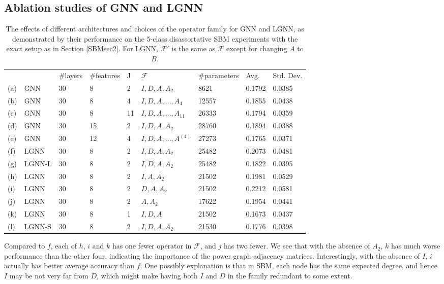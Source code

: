 \documentclass{article} \usepackage{iclr2019_conference,times}
\begin{document}
\subsection{Ablation studies of GNN and LGNN}
\label{ablations}
\begin{table}[h]


{\small 
\begin{tabular}{lllllllll}
 & & \#layers & \#features & J & $\mathcal{F}$ & \#parameters & Avg. & Std. Dev. \\
(a) & GNN & 30 & 8 & 2 & $I, D, A, A_2$ & 8621 & 0.1792 & 0.0385 \\
(b) & GNN & 30 & 8 & 4 & $I, D, A, ..., A_{4}$ & 12557 & 0.1855 & 0.0438 \\
(c) & GNN & 30 & 8 & 11 & $I, D, A, ..., A_{11}$ & 26333 & 0.1794 & 0.0359 \\
(d) & GNN & 30 & 15 & 2 & $I, D, A, A_{2}$ & 28760 & 0.1894 & 0.0388 \\
(e) & GNN & 30 & 12 & 4 & $I, D, A, ..., A^{(4)}$ & 27273 & 0.1765 & 0.0371 \\
(f) & LGNN & 30 & 8 & 2 & $I, D, A, A_{2}$ & 25482 & 0.2073 & 0.0481 \\
(g) & LGNN-L & 30 & 8 & 2 & $I, D, A, A_{2}$ & 25482 & 0.1822 & 0.0395 \\
(h) & LGNN & 30 & 8 & 2 & $I, A, A_{2}$ & 21502 & 0.1981 & 0.0529 \\
(i) & LGNN & 30 & 8 & 2 & $D, A, A_{2}$ & 21502 & 0.2212 & 0.0581 \\
(j) & LGNN & 30 & 8 & 2 & $A, A_{2}$ & 17622 & 0.1954 & 0.0441 \\
(k) & LGNN & 30 & 8 & 1 & $I, D, A$ & 21502 & 0.1673 & 0.0437 \\
(l) & LGNN-S & 30 & 8 & 2 & $I, D, A, A_{2}$ & 21530 & 0.1776 & 0.0398
\end{tabular}
  }
  \caption{\footnotesize{The effects of different architectures and choices of the operator family for GNN and LGNN, as demonstrated by their performance on the 5-class disassortative SBM experiments with the exact setup as in Section \ref{SBMsec2}. For LGNN, $\mathcal{F}'$ is the same as $\mathcal{F}$ except for changing $A$ to $B$.}}
  \label{ablations-table}
  \centering
\end{table}

Compared to $f$, each of $h$, $i$ and $k$ has one fewer operator in $\mathcal{F}$, and $j$ has two fewer. We see that with the absence of $A_{2}$, $k$ has much worse performance than the other four, indicating the importance of the power graph adjacency matrices. Interestingly, with the absence of $I$, $i$ actually has better average accuracy than $f$. One possibly explanation is that in SBM, each node has the same expected degree, and hence $I$ may be not very far from $D$, which might make having both $I$ and $D$ in the family redundant to some extent. 
\end{document}
